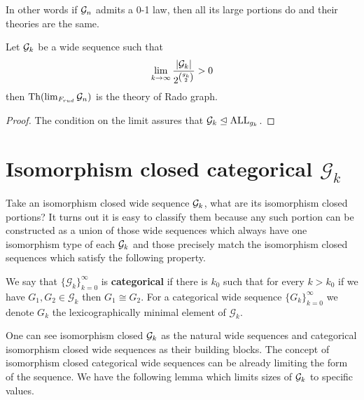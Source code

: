 In other words if $\mathcal{G}_n$ admits a 0-1 law, then all its large portions do and their theories are the same.

\begin{crll}\label{crlltoobig}
Let $\mathcal{G}_k$ be a wide sequence such that 
\[\lim_{k\to\infty}\frac{\left|{\mathcal{G}_k}\right|}{2^{\binom{g_k}{2}}}>0\] then $\text{Th}(\lim_{F_{rud}}\mathcal{G}_n)$ is the theory of Rado graph.
\end{crll}
\begin{proof}
The condition on the limit assures that $\mathcal{G}_k\trianglelefteq \text{ALL}_{g_k}$.
\end{proof}

\section{Isomorphism closed categorical $\mathcal{G}_k$}

Take an isomorphism closed wide sequence $\mathcal{G}_k$, what are its isomorphism closed portions? It turns out it is easy to classify them because any such portion can be constructed as a union of those wide sequences which always have one isomorphism type of each $\mathcal{G}_k$ and those precisely match the isomorphism closed sequences which satisfy the following property.

\begin{defi}\label{lemmisocat}
We say that $\{\mathcal{G}_k\}_{k=0}^\infty$ is \textbf{categorical} if there is $k_0$ such that for every $k>k_0$ if we have $G_1,G_2\in\mathcal{G}_k$ then $G_1\cong G_2$. For a categorical wide sequence $\{G_k\}_{k=0}^\infty$ we denote $G_k$ the lexicographically minimal element of $\mathcal{G}_k$.
\end{defi}

One can see isomorphism closed $\mathcal{G}_k$ as the natural wide sequences and categorical isomorphism closed wide sequences as their building blocks. The concept of isomorphism closed categorical wide sequences can be already limiting the form of the sequence. We have the following lemma which limits sizes of $\mathcal{G}_k$ to specific values.

